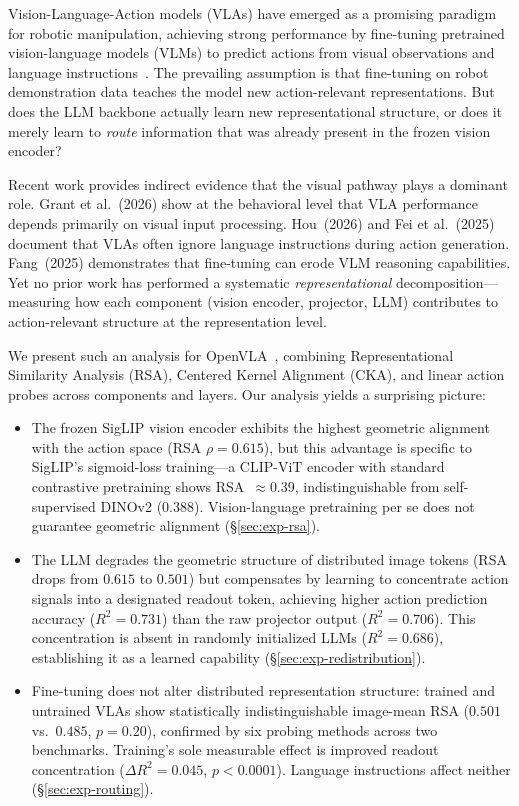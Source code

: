 \documentclass[letterpaper]{article}
\begin{document}
Vision-Language-Action models (VLAs) have emerged as a promising paradigm for robotic manipulation, achieving strong performance by fine-tuning pretrained vision-language models (VLMs) to predict actions from visual observations and language instructions~\cite{brohan2023rt2,kim2024openvla,karamcheti2024prismatic}. The prevailing assumption is that fine-tuning on robot demonstration data teaches the model new action-relevant representations. But does the LLM backbone actually learn new representational structure, or does it merely learn to \emph{route} information that was already present in the frozen vision encoder?

Recent work provides indirect evidence that the visual pathway plays a dominant role. Grant et al.~(2026) show at the behavioral level that VLA performance depends primarily on visual input processing. Hou~(2026) and Fei et al.~(2025) document that VLAs often ignore language instructions during action generation. Fang~(2025) demonstrates that fine-tuning can erode VLM reasoning capabilities. Yet no prior work has performed a systematic \emph{representational} decomposition---measuring how each component (vision encoder, projector, LLM) contributes to action-relevant structure at the representation level.

We present such an analysis for OpenVLA~\cite{kim2024openvla}, combining Representational Similarity Analysis (RSA), Centered Kernel Alignment (CKA), and linear action probes across components and layers. Our analysis yields a surprising picture:

\begin{itemize}
    \item The frozen SigLIP vision encoder exhibits the highest geometric alignment with the action space (RSA $\rho{=}0.615$), but this advantage is specific to SigLIP's sigmoid-loss training---a CLIP-ViT encoder with standard contrastive pretraining shows RSA~$\approx 0.39$, indistinguishable from self-supervised DINOv2 ($0.388$). Vision-language pretraining per se does not guarantee geometric alignment (\S\ref{sec:exp-rsa}).
    \item The LLM degrades the geometric structure of distributed image tokens (RSA drops from $0.615$ to $0.501$) but compensates by learning to concentrate action signals into a designated readout token, achieving higher action prediction accuracy ($R^2{=}0.731$) than the raw projector output ($R^2{=}0.706$). This concentration is absent in randomly initialized LLMs ($R^2{=}0.686$), establishing it as a learned capability (\S\ref{sec:exp-redistribution}).
    \item Fine-tuning does not alter distributed representation structure: trained and untrained VLAs show statistically indistinguishable image-mean RSA ($0.501$ vs.\ $0.485$, $p{=}0.20$), confirmed by six probing methods across two benchmarks. Training's sole measurable effect is improved readout concentration ($\Delta R^2{=}0.045$, $p{<}0.0001$). Language instructions affect neither (\S\ref{sec:exp-routing}).
\end{itemize}
\end{document}
